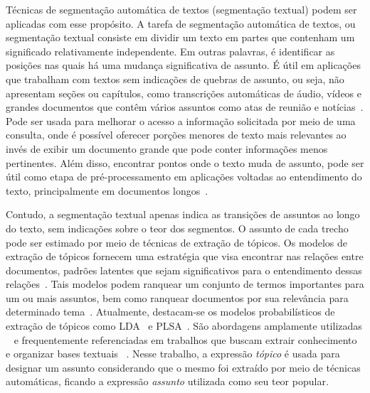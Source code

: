 Técnicas de segmentação automática de textos (segmentação textual) podem ser aplicadas com esse propósito. A tarefa de segmentação automática de textos, ou segmentação textual consiste em dividir um texto em partes que contenham um significado relativamente independente. Em outras palavras, é identificar as posições nas quais há uma mudança significativa de assunto. É útil em aplicações que trabalham com textos sem indicações de quebras de assunto, ou seja, não apresentam seções ou capítulos, como transcrições automáticas de áudio, vídeos e grandes documentos que contêm vários assuntos como atas de reunião e notícias~\cite{ Bokaei2015, Sakahara2014, Misra2009, Eisenstein2008, Choi2000}.
Pode ser usada para melhorar o acesso a informação solicitada por meio de uma consulta, onde é possível oferecer porções menores de texto mais relevantes ao invés de exibir um documento grande que pode conter informações menos pertinentes.  Além disso, encontrar pontos onde o texto muda de assunto, pode ser útil como etapa de pré-processamento em aplicações voltadas ao entendimento do texto, principalmente em documentos longos~\cite{Choi2000}.









Contudo, a segmentação textual apenas indica as transições de assuntos ao longo do texto,  
sem indicações sobre o teor dos segmentos.
O assunto de cada trecho pode ser estimado por meio de técnicas de extração de tópicos.  
Os modelos de extração de tópicos fornecem uma estratégia que visa encontrar nas relações entre documentos, padrões latentes que sejam significativos para o entendimento dessas relações~\cite{Wei2007}. Tais modelos podem ranquear um conjunto de termos importantes para um ou mais assuntos, bem como ranquear documentos por sua relevância para determinado tema~\cite{Faleiros2016,Xing2009}.
Atualmente, destacam-se os modelos probabilísticos de extração de tópicos como LDA~\cite{Blei2003} e PLSA~\cite{Hofmann1999}. São abordagens amplamente utilizadas ~\cite{DZhu20122} e frequentemente referenciadas em trabalhos que buscam extrair conhecimento e organizar bases textuais ~\cite{Steyvers2007, OCallaghan2015}.  
%
Nesse trabalho, a expressão \textit{tópico} é usada para designar um assunto considerando que o mesmo foi extraído por meio de técnicas automáticas, ficando a expressão \textit{assunto} utilizada como seu teor popular. 

